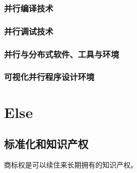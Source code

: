 \documentclass[UTF8]{../computerUniverse}
\begin{document}
\subsection{并行编译技术}
\subsection{并行调试技术}
\subsection{并行与分布式软件、工具与环境}
\subsection{可视化并行程序设计环境}







\chapter{Else}


\section{标准化和知识产权}

商标权是可以续住来长期拥有的知识产权。
\end{document}
